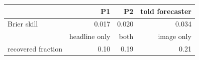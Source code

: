 \begin{tabular}{lrrr}
\toprule
 & P1 & P2 & told forecaster \\
\midrule
Brier skill & 0.017 & 0.020 & 0.034 \\
\midrule
 & headline only & both & image only \\
\midrule
recovered fraction & 0.10 & 0.19 & 0.21 \\
\bottomrule
\end{tabular}
